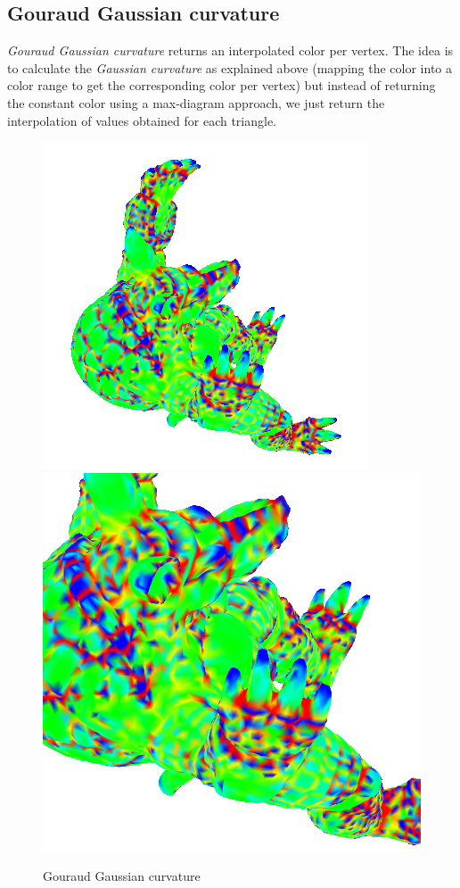 \subsection{Gouraud Gaussian curvature}
\textit{Gouraud Gaussian curvature} returns an interpolated color per vertex. The idea is to calculate the \textit{Gaussian curvature} as explained above (mapping the color into a color range to get the corresponding color per vertex) but instead of returning the constant color using a max-diagram approach, we just return the interpolation of values obtained for each triangle.

\begin{figure}[!h]
    \centering
    \centering
    \includegraphics[scale=1.0]{images/gci-armadillo-top.png}
    \endminipage\hfill
    \centering
    \includegraphics[scale=0.4]{images/gci-detail-armadillo-top.png}
    \endminipage
    \caption{Gouraud Gaussian curvature} \label{fig:gci-detail}
\end{figure}


